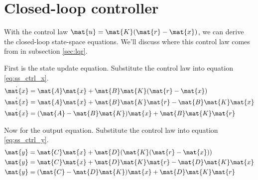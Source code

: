 \section{Closed-loop controller}

With the \gls{control law} $\mat{u} = \mat{K}(\mat{r} - \mat{x})$, we can derive
the closed-loop state-space equations. We'll discuss where this
\gls{control law} comes from in subsection \ref{sec:lqr}.

First is the \gls{state} update equation. Substitute the \gls{control law} into
equation \eqref{eq:ss_ctrl_x}.
\begin{align}
  \dot{\mat{x}} &= \mat{A}\mat{x} + \mat{B}\mat{K}(\mat{r} - \mat{x}) \nonumber
    \\
  \dot{\mat{x}} &= \mat{A}\mat{x} + \mat{B}\mat{K}\mat{r} -
    \mat{B}\mat{K}\mat{x} \nonumber \\
  \dot{\mat{x}} &= (\mat{A} - \mat{B}\mat{K})\mat{x} + \mat{B}\mat{K}\mat{r}
\end{align}

Now for the \gls{output} equation. Substitute the \gls{control law} into
equation \eqref{eq:ss_ctrl_y}.
\begin{align}
  \mat{y} &= \mat{C}\mat{x} + \mat{D}(\mat{K}(\mat{r} - \mat{x})) \nonumber \\
  \mat{y} &= \mat{C}\mat{x} + \mat{D}\mat{K}\mat{r} - \mat{D}\mat{K}\mat{x}
    \nonumber \\
  \mat{y} &= (\mat{C} - \mat{D}\mat{K})\mat{x} + \mat{D}\mat{K}\mat{r}
\end{align}

